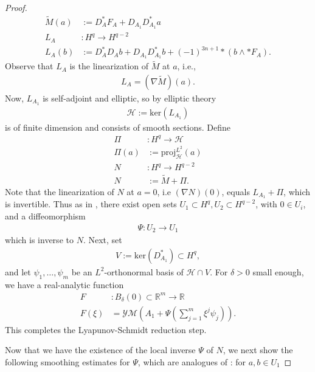 \documentclass[12pt]{amsart}
\renewcommand{\1}{{\mathbf 1}}
\newcommand{\R}{{\mathbb R}}
\theoremstyle{others}
\numberwithin{equation}{section}
\begin{document}
\begin{proof}
\begin{align*}
        \tilde{M}(a) &:= D_A^\ast F_A + D_{A_1}D_{A_1}^\ast a \\
        L_A &: H^q \to H^{q-2} \\
        L_A(b) &:= D_A^\ast D_Ab  + D_{A_1} D_{A_1}^\ast b+ (-1)^{3n+1}\ast (b \wedge \ast F_A).
    \end{align*}  Observe that \(L_A\) is the linearization of \(\tilde{M}\) at \(a\), i.e.,
    \begin{align*}
        L_A = (\nabla \tilde{M})(a).
    \end{align*}Now, \(L_{A_1}\) is self-adjoint and elliptic, so by elliptic theory
    \begin{align*}
        \mathcal{H} := \text{ker}(L_{A_1})
    \end{align*} is of finite dimension and consists of smooth sections. Define 
    \begin{align*}
        \Pi &: H^q \to \mathcal{H} \\
        \Pi(a) &:= \text{proj}_{\mathcal{H}}^{L^2}(a) \\
        N &: H^q \to H^{q-2} \\
        N &:= \tilde{M} + \Pi.
    \end{align*} Note that the linearization of \(N\) at \(a = 0\), i.e \((\nabla N)(0)\), equals \(L_{A_1} + \Pi\), which is invertible. Thus as in 
    \cite{leonsimon}, there exist open sets \(U_1 \subset H^q, U_2 \subset H^{q-2}\), with \(0 \in U_i\), and a diffeomorphism
    \begin{align*}
        \Psi : U_2 \to U_1
    \end{align*} which is inverse to \(N\). Next, set
    \begin{align*}
        V := \text{ker}(D_{A_1}^\ast) \subset H^q,
    \end{align*} and let \(\psi_1, \dots, \psi_m\) be an \(L^2\)-orthonormal basis of \(\mathcal{H} \cap V\). For \(\delta > 0\) small enough, we have a real-analytic \cite[(2.12)]{leonsimon} function
    \begin{align*}
        F &: B_\delta(0) \subset \R^m \to \R \\
        F(\xi) &= \mathcal{YM}\left(A_1 + \Psi\left(\sum_{j = 1}^m \xi^j \psi_j\right)\right).
    \end{align*} This completes the Lyapunov-Schmidt reduction step. \par
    Now that we have the existence of the local inverse \(\Psi\) of \(N\), we next show the following smoothing estimates for \(\Psi\), which are analogues of \cite[(2.9) and (2.10)]{leonsimon}: for \(a, b \in U_1\)

\end{proof}
\end{document}
